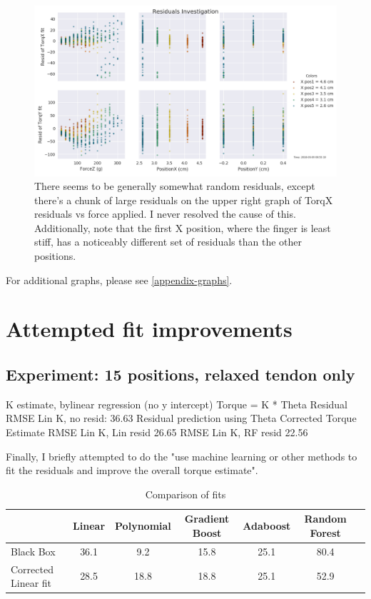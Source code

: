\documentclass[preprint,12pt,3p]{elsarticle}
\begin{document}
\begin{figure}[H]
\centering
\includegraphics[width=1\textwidth]{images/round1/resids_Force_coloredX.png}
\caption{There seems to be generally somewhat random residuals, except there's a chunk of large
residuals on the upper right graph of TorqX residuals vs force applied. I never resolved the cause
of this. Additionally, note that the first X position, where the finger is least stiff, has a
noticeably different set of residuals than the other positions.}
\end{figure}

For additional graphs, please see \ref{appendix-graphs}.
\section{Attempted fit improvements}
\subsection{Experiment: 15 positions, relaxed tendon only}

K estimate, bylinear regression (no y intercept)
Torque = K * Theta
Residual
RMSE Lin K, no resid: 36.63
Residual prediction using Theta
Corrected Torque Estimate
RMSE Lin K, Lin resid 26.65
RMSE Lin K, RF resid 22.56

Finally, I briefly attempted to do the "use machine learning or other methods to fit the residuals
and improve the overall torque estimate". 

\begin{table}[H]
    \centering
    \caption{Comparison of fits}\label{tab:MDP_calibration}
    \begin{tabular}{l|c|c|c|c|c|c}
         \hline \hline
         &  Linear & Polynomial & Gradient Boost & Adaboost & Random Forest\\
         \hline 
         Black Box          & 36.1 & 9.2 & 15.8 & 25.1 & 80.4 \\ 
         Corrected Linear fit & 28.5 & 18.8 & 18.8 & 25.1 & 52.9 \\
    \hline
    \end{tabular}
\end{table}
\end{document}

